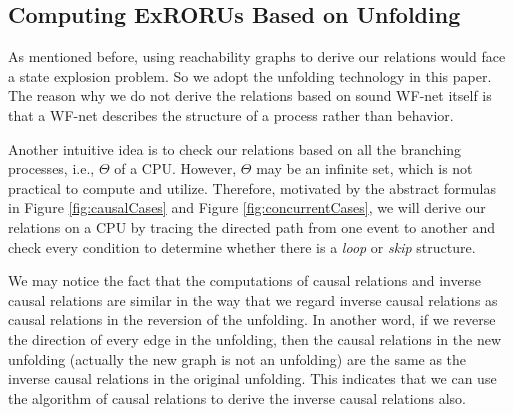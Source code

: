 \documentclass[dvips,...]{llncs}
\begin{document}
\subsection{Computing ExRORUs Based on Unfolding}\label{subsec:computationOfRelations}
As mentioned before, using reachability graphs to derive our relations would face a state explosion problem. %
So we adopt the unfolding technology in this paper. The reason why we do not derive the relations based on sound WF-net itself is that a WF-net describes the structure of a process rather than behavior.

Another intuitive idea is to check our relations based on all the branching processes, i.e., $\Theta$ of a CPU. However, $\Theta$ may be an infinite set, which is not practical to compute and utilize. Therefore, motivated by the abstract formulas in Figure \ref{fig:causalCases} and Figure \ref{fig:concurrentCases}, we will derive our relations on a CPU by tracing the directed path from one event to another and check every condition to determine whether there is a \textit{loop} or \textit{skip} structure.

We may notice the fact that the computations of causal relations and inverse causal relations are similar in the way that we regard inverse causal relations as causal relations in the reversion of the unfolding. In another word, if we reverse the direction of every edge in the unfolding, then the causal relations in the new unfolding (actually the new graph is not an unfolding) are the same as the inverse causal relations in the original unfolding. This indicates that we can use the algorithm of causal relations to derive the inverse causal relations also.
\end{document}
